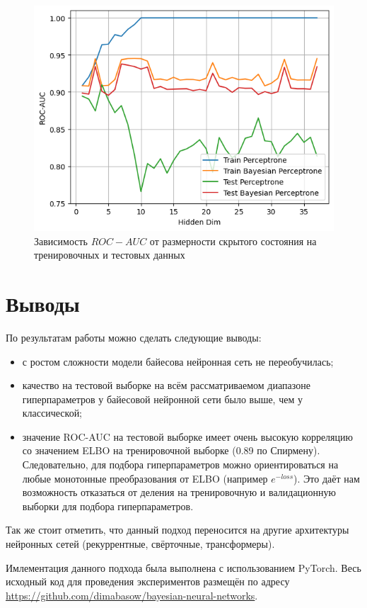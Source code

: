 \documentclass{article}
\begin{document}
\begin{figure}
    \centering
    \includegraphics[width=1\linewidth]{roc_auc.png}
    \caption{Зависимость $ROC-AUC$ от размерности скрытого состояния на тренировочных и тестовых данных}
    \label{fig:enter-label}
\end{figure}

\section{Выводы}
По результатам работы можно сделать следующие выводы:
\begin{itemize}
    \item с ростом сложности модели байесова нейронная сеть не переобучилась;
    \item качество на тестовой выборке на всём рассматриваемом диапазоне гиперпараметров у байесовой нейронной сети было выше, чем у классической;
    \item значение ROC-AUC на тестовой выборке имеет очень высокую корреляцию со значением ELBO на тренировочной выборке (0.89 по Спирмену). Следовательно, для подбора гиперпараметров можно ориентироваться на любые монотонные преобразования от ELBO (например $e^{-loss}$). Это даёт нам возможность отказаться от деления на тренировочную и валидационную выборки для подбора гиперпараметров.
\end{itemize}

Так же стоит отметить, что данный подход переносится на другие архитектуры нейронных сетей (рекуррентные, свёрточные, трансформеры).

Имлементация данного подхода была выполнена с использованием PyTorch. Весь исходный код для проведения экспериментов размещён по адресу \url{https://github.com/dimabasow/bayesian-neural-networks}.
\end{document}
